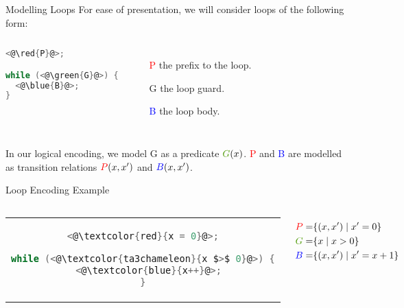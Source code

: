 \documentclass[xcolor=pdftex,t,11pt]{beamer}
\newcommand{\red}[1]{\textcolor{red}{#1}}
\newcommand{\blue}[1]{\textcolor{blue}{#1}}
\newcommand{\green}[1]{\textcolor{ta3chameleon}{#1}}
\begin{document}
\begin{frame}[fragile]{Modelling Loops}
 For ease of presentation, we will consider loops of the following form:

 \begin{center}
 \begin{columns}[c]
  \begin{minipage}{\linewidth}
 \begin{lstlisting}[language=C,basicstyle=\normalsize]
<@\red{P}@>;

while (<@\green{G}@>) {
  <@\blue{B}@>;
}
 \end{lstlisting}
 \end{minipage}
 

 \begin{minipage}{\linewidth}
 \begin{itemize}
  \item[\red{P}] the prefix to the loop.
  \item[\green{G}] the loop guard.
  \item[\blue{B}] the loop body.
 \end{itemize}
 \end{minipage}
 \end{columns}

 \end{center}

\vspace{1em}
 
In our logical encoding, we model \green{G} as a predicate $\green{G}(x)$. \red{P} and \blue{B} are modelled as transition
relations $\red{P}(x, x')$ and $\blue{B}(x, x')$.
 
\end{frame}

\begin{frame}[fragile]{Loop Encoding Example}

\begin{columns}[c]

 \begin{center}
 \begin{tabular}{c}

 \begin{lstlisting}[language=C,basicstyle=\normalsize,mathescape]
<@\red{x = 0}@>;

while (<@\green{x $>$ 0}@>) {
  <@\blue{x++}@>;
}
 \end{lstlisting}
 \end{tabular}
 \end{center}

\begin{align*}
 \red{P} = & \{ (x, x') \mid x' = 0 \} \\
 \green{G} = & \{ x \mid x > 0 \} \\
 \blue{B} = & \{ (x, x') \mid x' = x + 1 \}
\end{align*}
\end{columns}

\end{frame}
\end{document}
